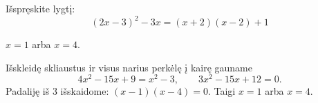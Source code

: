 \begin{salyga}
Išspręskite lygtį:
    \[ (2x - 3)^2 - 3x = (x + 2)(x - 2) + 1 \]
\end{salyga}

\begin{atsakymas}
$x=1$ arba $x=4$.
\end{atsakymas}

\begin{sprendimas}
Išskleidę skliaustus ir visus narius perkėlę į kairę gauname
\[
4x^2-15x+9=x^2-3,\qquad 3x^2-15x+12=0.
\]
Padaliję iš $3$ išskaidome: $(x-1)(x-4)=0$. Taigi $x=1$ arba $x=4$.
\end{sprendimas}

